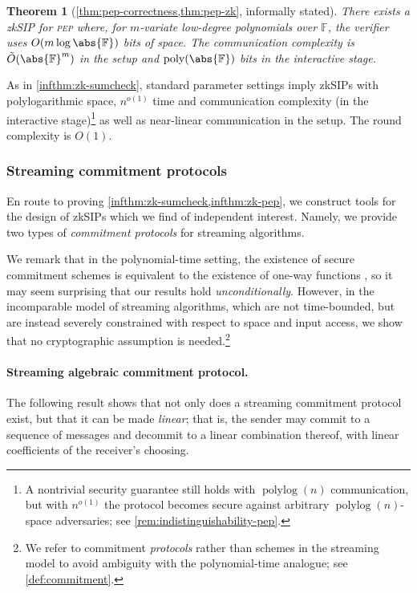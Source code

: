 \documentclass[10pt,a4paper]{article}
\newif\iflipics\lipicsfalse
\newtheorem{theorem}{Theorem}[section]
\theoremstyle{definition}
\newcommand{\zksip}{\textrm{zkSIP}}
\newcommand{\field}{\mathbb{F}}
\newcommand{\poly}{\operatorname{poly}}
\newcommand{\polylog}{\operatorname{polylog}}
\newcommand{\pep}{\normalfont\textsc{pep}\xspace}
\newcommand{\dimension}{m}
\begin{document}
\begin{theorem}[\cref{thm:pep-correctness,thm:pep-zk}, informally stated]
    \label{infthm:zk-pep}
    There exists a \zksip{} for \pep where, for $\dimension$-variate low-degree polynomials over $\field$, the verifier uses $O(\dimension \log \abs{\field})$ bits of space. The communication complexity is $\tilde O(\abs{\field}^\dimension)$ in the setup and $\poly(\abs{\field})$ bits in the interactive stage.
\end{theorem}
As in \cref{infthm:zk-sumcheck}, standard parameter settings imply \zksip{}s with polylogarithmic space, $n^{o(1)}$ time and communication complexity (in the interactive stage)\footnote{A nontrivial security guarantee still holds with $\polylog(n)$ communication, but with $n^{o(1)}$ the protocol becomes secure against arbitrary $\polylog(n)$-space adversaries; see \cref{rem:indistinguishability-pep}.} as well as near-linear communication in the setup. The round complexity is $O(1)$.

\subsubsection{Streaming commitment protocols}
En route to proving \cref{infthm:zk-sumcheck,infthm:zk-pep}, we construct tools for the design of \zksip{}s which we find of independent interest. Namely, we provide two types of \emph{commitment protocols} for streaming algorithms.

We remark that in the polynomial-time setting, the existence of secure commitment schemes is equivalent to the existence of one-way functions \cite{IL89, N91, HILL99}, so it may seem surprising that our results hold \emph{unconditionally}. However, in the incomparable model of streaming algorithms, which are not time-bounded, but are instead severely constrained with respect to space and input access, we show that no cryptographic assumption is needed.\footnote{We refer to commitment \emph{protocols} rather than schemes in the streaming model to avoid ambiguity with the polynomial-time analogue; see \cref{def:commitment}.}

\paragraph*{Streaming algebraic commitment protocol\iflipics\else.\fi}
The following result shows that not only does a streaming commitment protocol exist, but that it can be made \emph{linear}; that is, the sender may commit to a sequence of messages and decommit to a linear combination thereof, with linear coefficients of the receiver's choosing.
\end{document}
